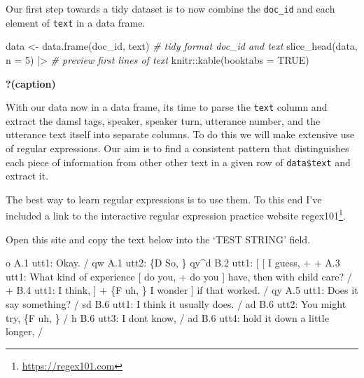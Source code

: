 \documentclass[
  letterpaper,
  DIV=11,
  numbers=noendperiod]{scrreport}
\newenvironment{Shaded}{\begin{snugshade}}{\end{snugshade}}
\newcommand{\AttributeTok}[1]{\textcolor[rgb]{0.00,0.00,0.00}{#1}}
\newcommand{\CommentTok}[1]{\textcolor[rgb]{0.00,0.00,0.00}{\textit{#1}}}
\newcommand{\ConstantTok}[1]{\textcolor[rgb]{0.00,0.00,0.00}{#1}}
\newcommand{\DecValTok}[1]{\textcolor[rgb]{0.00,0.00,0.00}{#1}}
\newcommand{\FunctionTok}[1]{\textcolor[rgb]{0.00,0.00,0.00}{#1}}
\newcommand{\NormalTok}[1]{\textcolor[rgb]{0.00,0.00,0.00}{#1}}
\newcommand{\OtherTok}[1]{\textcolor[rgb]{0.00,0.00,0.00}{#1}}
\newcommand{\SpecialCharTok}[1]{\textcolor[rgb]{0.00,0.00,0.00}{#1}}
\theoremstyle{definition}
\theoremstyle{remark}
\DeclareRobustCommand{\href}[2]{#2\footnote{\url{#1}}}
\begin{document}
Our first step towards a tidy dataset is to now combine the
\texttt{doc\_id} and each element of \texttt{text} in a data frame.

\begin{Shaded}
\begin{Highlighting}[]
\NormalTok{data }\OtherTok{\textless{}{-}} \FunctionTok{data.frame}\NormalTok{(doc\_id, text) }\CommentTok{\# tidy format \textasciigrave{}doc\_id\textasciigrave{} and \textasciigrave{}text\textasciigrave{}}
\FunctionTok{slice\_head}\NormalTok{(data, }\AttributeTok{n =} \DecValTok{5}\NormalTok{) }\SpecialCharTok{|\textgreater{}} \CommentTok{\# preview first lines of \textasciigrave{}text\textasciigrave{}}
\NormalTok{  knitr}\SpecialCharTok{::}\FunctionTok{kable}\NormalTok{(}\AttributeTok{booktabs =} \ConstantTok{TRUE}\NormalTok{)}
\end{Highlighting}
\end{Shaded}

\begin{table}

\caption{\textbf{?(caption)}}

\end{table}

With our data now in a data frame, its time to parse the \texttt{text}
column and extract the damsl tags, speaker, speaker turn, utterance
number, and the utterance text itself into separate columns. To do this
we will make extensive use of regular expressions. Our aim is to find a
consistent pattern that distinguishes each piece of information from
other other text in a given row of \texttt{data\$text} and extract it.

The best way to learn regular expressions is to use them. To this end
I've included a link to the interactive regular expression practice
website \href{https://regex101.com}{regex101}.

Open this site and copy the text below into the `TEST STRING' field.

\begin{Shaded}
\begin{Highlighting}[]
\NormalTok{o          A.1 utt1: Okay.  /}
\NormalTok{qw          A.1 utt2: \{D So, \}}
\NormalTok{qy\^{}d          B.2 utt1: [ [ I guess, +}
\NormalTok{+          A.3 utt1: What kind of experience [ do you, + do you ] have, then with child care? /}
\NormalTok{+          B.4 utt1: I think, ] + \{F uh, \} I wonder ] if that worked. /}
\NormalTok{qy          A.5 utt1: Does it say something? /}
\NormalTok{sd          B.6 utt1: I think it usually does.  /}
\NormalTok{ad          B.6 utt2: You might try, \{F uh, \}  /}
\NormalTok{h          B.6 utt3: I don\textquotesingle{}t know,  /}
\NormalTok{ad          B.6 utt4: hold it down a little longer,  /}
\end{Highlighting}
\end{Shaded}
\end{document}
